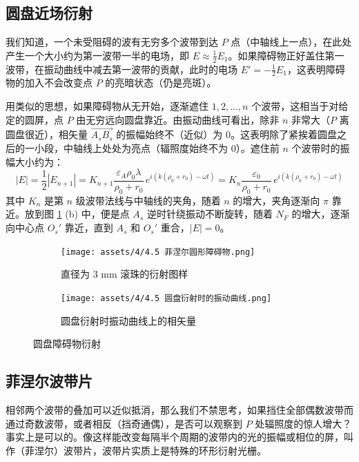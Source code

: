 \documentclass[UTF8]{report}
\theoremstyle{MyLineTheoremStyle} %
\theoremstyle{MyBlockTheoremStyle} %
\theoremstyle{MySubsubsectionStyle} %
\begin{document}
\subsection{圆盘近场衍射}

我们知道，一个未受阻碍的波有无穷多个波带到达 $P$ 点（中轴线上一点），在此处产生一个大小约为第一波带一半的电场，即 $E \approx \frac{1}{2} E_1$。如果障碍物正好盖住第一波带，在振动曲线中减去第一波带的贡献，此时的电场 $E' = -\frac{1}{2}E_1$，这表明障碍物的加入不会改变点 $P$ 的亮暗状态（仍是亮斑）。

用类似的思想，如果障碍物从无开始，逐渐遮住 $1, 2, ..., n$ 个波带，这相当于对给定的圆屏，点 $P$ 由无穷远向圆盘靠近。由振动曲线可看出，除非 $n$ 非常大（$P$ 离圆盘很近），相矢量 $\overrightarrow{A_sB_s}$ 的振幅始终不（近似）为 0。这表明除了紧挨着圆盘之后的一小段，中轴线上处处为亮点（辐照度始终不为 0）。遮住前 $n$ 个波带时的振幅大小约为：
\begin{equation}
| E | = \frac{1}{2}| E_{n+1} | = K_{n+1} \frac{\varepsilon_A \rho_0 \lambda}{\rho_0 + r_0} \,e^{i\left(k(\rho_0 + r_0) - \omega t\right)} =  K_n \frac{\varepsilon_0}{\rho_0 + r_0} \,e^{i\left(k(\rho_0 + r_0) - \omega t\right)} 
\end{equation}
其中 $K_n$ 是第 $n$ 级波带法线与中轴线的夹角，随着 $n$ 的增大，夹角逐渐向 $\pi$ 靠近。放到图 \ref{圆盘障碍物衍射} (b) 中，便是点 $A_s$ 逆时针绕振动不断旋转，随着 $N_F$ 的增大，逐渐向中心点 $O_s'$ 靠近，直到 $A_s$ 和 $O_s'$ 重合，$| E | = 0 $。

\begin{figure}[H]\centering
\begin{subfigure}[b]{0.5\columnwidth}\centering
    \texttt{[image: assets/4/4.5 菲涅尔圆形障碍物.png]}
    \caption{直径为 3 mm 滚珠的衍射图样}
\end{subfigure}\hfill
\begin{subfigure}[b]{0.5\columnwidth}\centering
    \texttt{[image: assets/4/4.5 圆盘衍射时的振动曲线.png]}
    \caption{圆盘衍射时振动曲线上的相矢量}
\end{subfigure}
\caption{圆盘障碍物衍射}
\label{圆盘障碍物衍射}
\end{figure}

\subsection{菲涅尔波带片}
相邻两个波带的叠加可以近似抵消，那么我们不禁思考，如果挡住全部偶数波带而通过奇数波带，或者相反（挡奇通偶），是否可以观察到 $P$ 处辐照度的惊人增大？事实上是可以的。像这样能改变每隔半个周期的波带内的光的振幅或相位的屏，叫作（菲涅尔）波带片，波带片实质上是特殊的环形衍射光栅。
\end{document}
